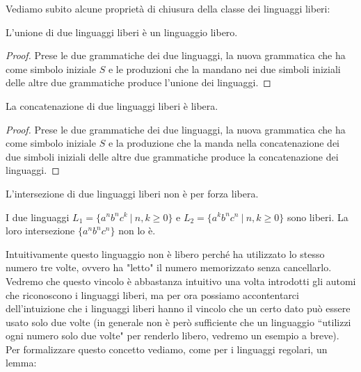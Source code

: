 \documentclass[12pt]{article}
\numberwithin{theorem}{subsection}
\begin{document}
Vediamo subito alcune proprietà di chiusura della classe dei linguaggi liberi:
\begin{prop}
	L'unione di due linguaggi liberi è un linguaggio libero.
\end{prop}
\begin{proof}
	Prese le due grammatiche dei due linguaggi, la nuova grammatica che ha come simbolo iniziale $S$ e le produzioni che la mandano nei due simboli iniziali delle altre due grammatiche produce l'unione dei linguaggi.
\end{proof}

\begin{prop}
	La concatenazione di due linguaggi liberi è libera.
\end{prop}
\begin{proof}
	Prese le due grammatiche dei due linguaggi, la nuova grammatica che ha come simbolo iniziale $S$ e la produzione che la manda nella concatenazione dei due simboli iniziali delle altre due grammatiche produce la concatenazione dei linguaggi.
\end{proof}

\begin{remark}
	L'intersezione di due linguaggi liberi non è per forza libera.
\end{remark}

\begin{example}
	I due linguaggi $L_1 = \{ a^nb^nc^k \ \vert \ n, k \ge 0 \}$ e $L_2 = \{ a^kb^nc^n \ \vert \ n, k \ge 0 \}$ sono liberi. La loro intersezione $\{ a^n b^n c^n \}$ non lo è.
\end{example}

Intuitivamente questo linguaggio non è libero perché ha utilizzato lo stesso numero tre volte, ovvero ha "letto" il numero memorizzato senza cancellarlo. Vedremo che questo vincolo è abbastanza intuitivo una volta introdotti gli automi che riconoscono i linguaggi liberi, ma per ora possiamo accontentarci dell'intuizione che i linguaggi liberi hanno il vincolo che un certo dato può essere usato solo due volte (in generale non è però sufficiente che un linguaggio ``utilizzi ogni numero solo due volte" per renderlo libero, vedremo un esempio a breve). Per formalizzare questo concetto vediamo, come per i linguaggi regolari, un lemma:
\end{document}
